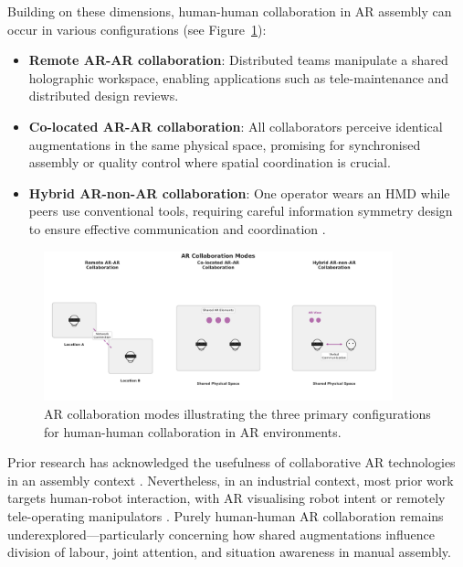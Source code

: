 Building on these dimensions, human-human collaboration in AR assembly can occur in various configurations (see Figure~\ref{fig:ar-collab-modes}):

\begin{itemize}
  \item \textbf{Remote AR-AR collaboration}: Distributed teams manipulate a shared holographic workspace, enabling applications such as tele-maintenance and distributed design reviews.
  \item \textbf{Co-located AR-AR collaboration}: All collaborators perceive identical augmentations in the same physical space, promising for synchronised assembly or quality control where spatial coordination is crucial.
  \item \textbf{Hybrid AR-non-AR collaboration}: One operator wears an HMD while peers use conventional tools, requiring careful information symmetry design to ensure effective communication and coordination \cite{aschenbrenner2018collaborative}.
\end{itemize}

\begin{figure}[t!]
    \centering
    \includegraphics[width=0.9\textwidth]{assets/02/ar-collaboration-modes.pdf}
    \caption{AR collaboration modes illustrating the three primary configurations for human-human collaboration in AR environments.}
    \label{fig:ar-collab-modes}
\end{figure}

Prior research has acknowledged the usefulness of collaborative AR technologies in an assembly context \cite{wang2016arAssemblyLitRev}. Nevertheless, in an industrial context, most prior work targets human-robot interaction, with AR visualising robot intent or remotely tele-operating manipulators \cite{schmidt2022augmentedReality}. Purely human-human AR collaboration remains underexplored—particularly concerning how shared augmentations influence division of labour, joint attention, and situation awareness in manual assembly.


